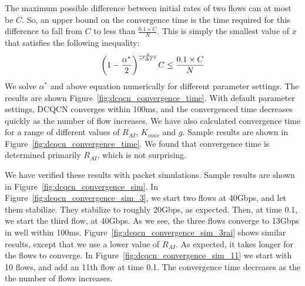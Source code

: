 The maximum possible difference between initial rates of two flows can at most
be $C$. So, an upper bound on the convergence time is the time required for this
difference to fall from $C$ to less than $\frac{0.1 \times C}{N}$. This is
simply the smallest value of $x$ that satisfies the following inequality: 
\begin{equation} 
\small 
{ \left( {1 - \frac{{{\alpha ^*}}}{2}} \right)^{\frac{x}{{\tau '\Delta{T^*}}}}}C \le \frac{0.1 \times C}{N} 
\end{equation}
We solve $\alpha^*$ and above equation numerically for different parameter settings. The results are
shown Figure~\ref{fig:dcqcn_convergence_time}. With default parameter settings,
DCQCN converges within 100ms, and the convergenced time decreases quickly as the
number of flow increases.  We have also calculated convergence time for a range
of different values of $R_{AI}$, $K_{max}$ and $g$. Sample results are shown in
Figure~\ref{fig:dcqcn_convergence_time}. We found that convergence time is
determined primarily $R_{AI}$, which is not surprising.

We have verified these results with packet simulations. Sample results are shown
in Figure~\ref{fig:dcqcn_convergence_sim}. In
Figure~\ref{fig:dcqcn_convergence_sim_3}, we start two flows at 40Gbps, and let
them stabilize. They stabilize to roughly 20Gbps, as expected. Then, at time
0.1, we start the third flow, at 40Gbps. As we see, the three flows converge to
13Gbps in well within 100ms. Figure~\ref{fig:dcqcn_convergence_sim_3rai} shows
similar results, except that we use a lower value of $R_{AI}$. As expected, it
takes longer for the flows to converge. In
Figure~\ref{fig:dcqcn_convergence_sim_11} we start with 10 flows, and add an
11th flow at time 0.1. The convergence time decreases as the the number of flows
increases.








